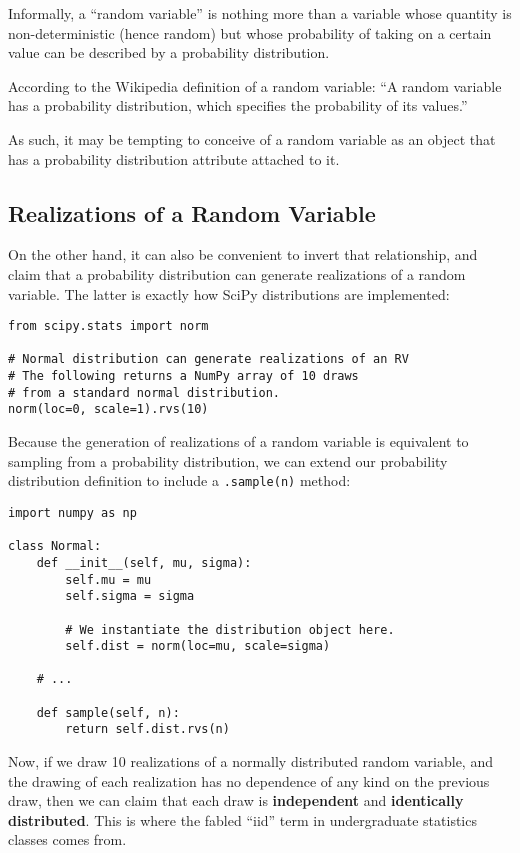 Informally, a ``random variable'' is nothing more than a variable whose quantity is non-deterministic (hence random) but whose probability of taking on a certain value can be described by a probability distribution.

According to the Wikipedia definition of a random variable:
``A random variable has a probability distribution, which specifies the probability of its values.''

As such, it may be tempting to conceive of a random variable as an object that has a probability distribution attribute attached to it.

\subsection{Realizations of a Random Variable}

On the other hand, it can also be convenient to invert that relationship, and claim that a probability distribution can generate realizations of a random variable. The latter is exactly how SciPy distributions are implemented:
\begin{lstlisting}
from scipy.stats import norm

# Normal distribution can generate realizations of an RV
# The following returns a NumPy array of 10 draws
# from a standard normal distribution.
norm(loc=0, scale=1).rvs(10)
\end{lstlisting}
Because the generation of realizations of a random variable is equivalent to sampling from a probability distribution, we can extend our probability distribution definition to include a \lstinline{.sample(n)} method:

\begin{lstlisting}
import numpy as np

class Normal:
    def __init__(self, mu, sigma):
        self.mu = mu
        self.sigma = sigma

        # We instantiate the distribution object here.
        self.dist = norm(loc=mu, scale=sigma)

    # ...

    def sample(self, n):
        return self.dist.rvs(n)
\end{lstlisting}

Now, if we draw 10 realizations of a normally distributed random variable, and the drawing of each realization has no dependence of any kind on the previous draw, then we can claim that each draw is \textbf{independent} and \textbf{identically distributed}. This is where the fabled ``iid'' term in undergraduate statistics classes comes from.

